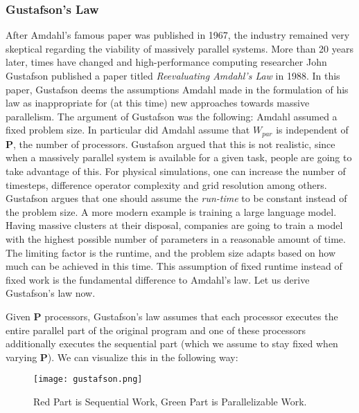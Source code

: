 \documentclass[main.tex]{subfiles}
\begin{document}
\subsubsection{Gustafson's Law} \label{Gustafson's Law}
After Amdahl's famous paper was published in 1967, the industry remained very skeptical regarding the viability of massively parallel systems. More than 20 years later, times have changed and high-performance computing researcher John Gustafson published a paper titled \textit{Reevaluating Amdahl's Law} in 1988. In this paper, Gustafson deems the assumptions Amdahl made in the formulation of his law as inappropriate for (at this time) new approaches towards massive parallelism. The argument of Gustafson was the following: Amdahl assumed a fixed problem size. In particular did Amdahl assume that $W_{par}$ is independent of \textbf{P}, the number of processors. Gustafson argued that this is not realistic, since when a massively parallel system is available for a given task, people are going to take advantage of this. For physical simulations, one can increase the number of timesteps, difference operator complexity and grid resolution among others. Gustafson argues that one should assume the \textit{run-time} to be constant instead of the problem size. A more modern example is training a large language model. Having massive clusters at their disposal, companies are going to train a model with the highest possible number of parameters in a reasonable amount of time. The limiting factor is the runtime, and the problem size adapts based on how much can be achieved in this time. This assumption of fixed runtime instead of fixed work is the fundamental difference to Amdahl's law. Let us derive Gustafson's law now.

Given \textbf{P} processors, Gustafson's law assumes that each processor executes the entire parallel part of the original program and one of these processors additionally executes the sequential part (which we assume to stay fixed when varying \textbf{P}). We can visualize this in the following way:

\begin{figure}[H]
    \centering
    \texttt{[image: gustafson.png]}
    \caption{Red Part is Sequential Work, Green Part is Parallelizable Work.}
\end{figure}
\end{document}
